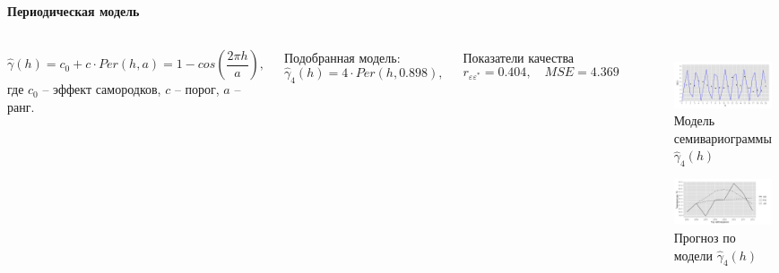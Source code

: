 \documentclass[10pt,pdf,aspectratio=169,hyperref={unicode},notheorems]{beamer}
\theoremstyle{definition}
\theoremstyle{example}
\theoremstyle{plain}
\begin{document}
\begin{frame}
  \frametitle{\large\subsecname}
  \framesubtitle{Периодическая модель}
  \begin{columns}[c]
  \column{3in}
  \begin{equation}
  \label{eq:per}
    \widehat{\gamma}(h) = c_0 + c \cdot Per(h, a) = 1 - cos(\frac{2 \pi h}{a}),
  \end{equation}
  где $ c_0 $ -- эффект самородков, $ c $ -- порог, $ a $ -- ранг.

  \vspace{0.5em}

  Подобранная модель:
  \begin{equation}
  \label{eq:gamma6}
    \widehat{\gamma}_4(h) = 4 \cdot Per(h, 0.898),
  \end{equation}

  Показатели качества
  \begin{equation*}
    r_{\varepsilon\varepsilon^{*}} = 0.404, \quad MSE = 4.369
  \end{equation*}

  \column{3in}
  \vspace{-14.5pt}
  \begin{figure}[H]
    \includegraphics[width=0.9\linewidth]{../../figures/variogram/per-fit-cv-modeled.png} \\
    \caption{Модель семивариограммы $\widehat{\gamma}_4(h)$}
    \includegraphics[width=0.9\linewidth]{../../figures/variogram/per-fit-cv-cross-prediction.png}
    \caption{Прогноз по модели $\widehat{\gamma}_4(h)$}
  \end{figure}
  \end{columns}
\end{frame}
\end{document}
